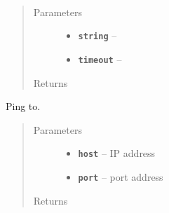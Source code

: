 \documentclass[letterpaper,10pt,english]{sphinxmanual}
\begin{document}
\begin{fulllineitems}
\label{RRtoolbox.lib:RRtoolbox.lib.serverServices.parseString}~\begin{quote}\begin{description}
\item[{Parameters}] \leavevmode\begin{itemize}
\item {} 
\textbf{\texttt{string}} -- 

\item {} 
\textbf{\texttt{timeout}} -- 

\end{itemize}

\item[{Returns}] \leavevmode


\end{description}\end{quote}

\end{fulllineitems}


\begin{fulllineitems}
\label{RRtoolbox.lib:RRtoolbox.lib.serverServices.ping}
Ping to.
\begin{quote}\begin{description}
\item[{Parameters}] \leavevmode\begin{itemize}
\item {} 
\textbf{\texttt{host}} -- IP address

\item {} 
\textbf{\texttt{port}} -- port address

\end{itemize}

\item[{Returns}] \leavevmode


\end{description}\end{quote}

\end{fulllineitems}

\end{document}
